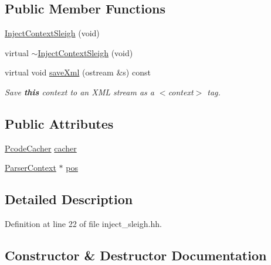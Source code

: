 \subsection*{Public Member Functions}
\begin{DoxyCompactItemize}
\item 
\mbox{\hyperlink{class_inject_context_sleigh_ac93655dd518e1511f170f8ce77842497}{Inject\+Context\+Sleigh}} (void)
\item 
virtual \mbox{\hyperlink{class_inject_context_sleigh_ac3d075f7afca72cebc14e5e44db94c20}{$\sim$\+Inject\+Context\+Sleigh}} (void)
\item 
virtual void \mbox{\hyperlink{class_inject_context_sleigh_a5f54348510c2aa5002d93d3fbf0c645a}{save\+Xml}} (ostream \&s) const
\begin{DoxyCompactList}\small\item\em Save {\bfseries{this}} context to an X\+ML stream as a $<$context$>$ tag. \end{DoxyCompactList}\end{DoxyCompactItemize}
\subsection*{Public Attributes}
\begin{DoxyCompactItemize}
\item 
\mbox{\hyperlink{class_pcode_cacher}{Pcode\+Cacher}} \mbox{\hyperlink{class_inject_context_sleigh_a83bd13e4152f969e2db32052bb960268}{cacher}}
\item 
\mbox{\hyperlink{class_parser_context}{Parser\+Context}} $\ast$ \mbox{\hyperlink{class_inject_context_sleigh_a4f304984d73d8e7b00b976af7e80bd75}{pos}}
\end{DoxyCompactItemize}


\subsection{Detailed Description}


Definition at line 22 of file inject\+\_\+sleigh.\+hh.



\subsection{Constructor \& Destructor Documentation}
\mbox{\label{class_inject_context_sleigh_ac93655dd518e1511f170f8ce77842497}} 
